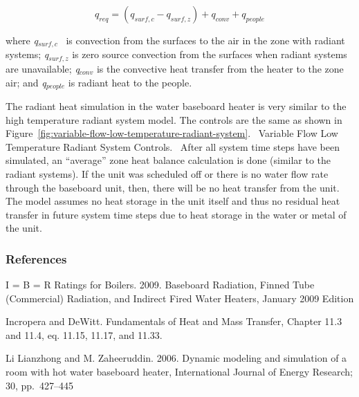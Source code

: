 \begin{equation}
{q_{req}} = ({q_{surf,c}} - {q_{surf,z}}) + {q_{conv}} + {q_{people}}
\end{equation}

where \emph{q\(_{surf,c}\)} ~is convection from the surfaces to the air in the zone with radiant systems; \emph{q\(_{surf,z}\)} is zero source convection from the surfaces when radiant systems are unavailable; \emph{q\(_{conv}\)} is the convective heat transfer from the heater to the zone air; and \emph{q\(_{people}\)} is radiant heat to the people.

The radiant heat simulation in the water baseboard heater is very similar to the high temperature radiant system model. The controls are the same as shown in Figure~\ref{fig:variable-flow-low-temperature-radiant-system}.~ Variable Flow Low Temperature Radiant System Controls.~ After all system time steps have been simulated, an ``average'' zone heat balance calculation is done (similar to the radiant systems). If the unit was scheduled off or there is no water flow rate through the baseboard unit, then, there will be no heat transfer from the unit. The model assumes no heat storage in the unit itself and thus no residual heat transfer in future system time steps due to heat storage in the water or metal of the unit.

\subsubsection{References}\label{references-2-001}

I = B = R Ratings for Boilers. 2009. Baseboard Radiation, Finned Tube (Commercial) Radiation, and Indirect Fired Water Heaters, January 2009 Edition

Incropera and DeWitt. Fundamentals of Heat and Mass Transfer, Chapter 11.3 and 11.4, eq. 11.15, 11.17, and 11.33.

Li Lianzhong and M. Zaheeruddin. 2006. Dynamic modeling and simulation of a room with hot water baseboard heater, International Journal of Energy Research; 30, pp.~427--445
